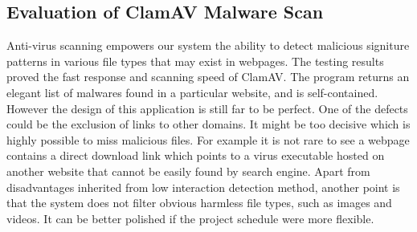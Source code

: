 \subsection{Evaluation of ClamAV Malware Scan}
Anti-virus scanning empowers our system the ability to detect malicious 
signiture patterns in various file types that may exist in webpages. The 
testing results proved the fast response and scanning speed of ClamAV. The 
program returns an elegant list of malwares found in a particular website, and 
is self-contained. \\
However the design of this application is still far to be perfect. One of the 
defects could be the exclusion of links to other domains. It might be too 
decisive which is highly possible to miss malicious files.  For example it is 
not rare to see a webpage contains a direct download link which points to a 
virus executable hosted on another website that cannot be easily found by 
search engine. Apart from disadvantages inherited from low interaction 
detection method, another point is that the system does not filter obvious 
harmless file types, such as images and videos. It can be better polished if 
the project schedule were more flexible.  

